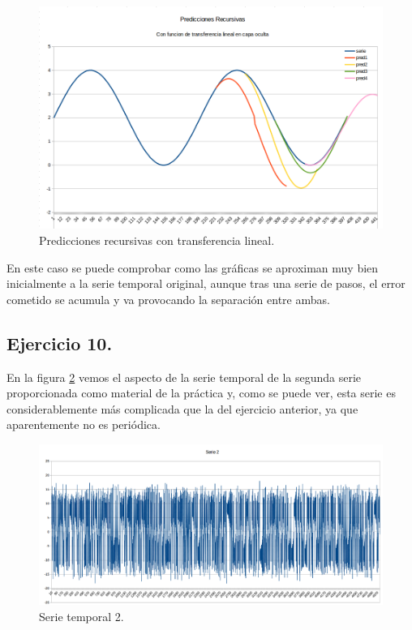 \documentclass[spanish]{assignment}
\begin{document}
	\begin{figure}[H]
		\centering
		\includegraphics[scale=0.25]{recursive_lin.png}		
		\caption{Predicciones recursivas con transferencia lineal.}				
		\label{recursive_lin}
	\end{figure}
	
	En este caso se puede comprobar como las gráficas se aproximan muy bien inicialmente a la serie temporal original, aunque tras una serie de pasos, el error cometido se acumula y va provocando la separación entre ambas.
	
	\subsection{Ejercicio 10.}
	En la figura \ref{grafico_p2} vemos el aspecto de la serie temporal de la segunda serie proporcionada como material de la práctica y, como se puede ver, esta serie es considerablemente más complicada que la del ejercicio anterior, ya que aparentemente no es periódica.
	
	\begin{figure}[H]
		\centering
		\includegraphics[scale=0.25]{p3_serie2.png}		
		\caption{Serie temporal 2.}				
		\label{grafico_p2}
	\end{figure}
	
\end{document}
